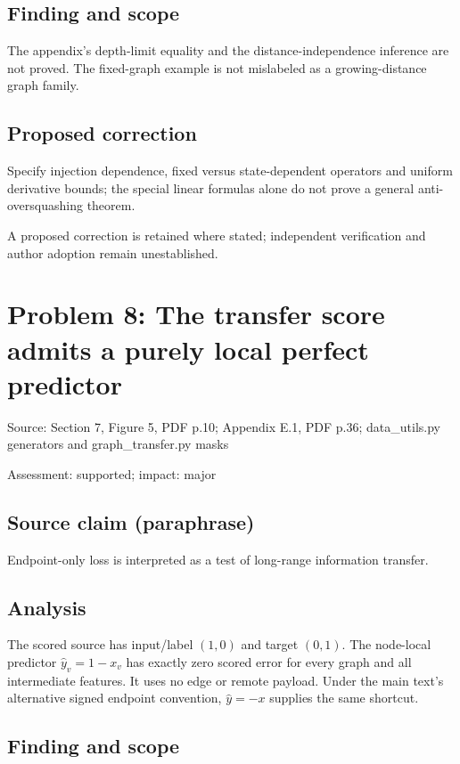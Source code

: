 \documentclass[11pt]{article}
\begin{document}
\subsection*{Finding and scope}

The appendix’s depth-limit equality and the distance-independence inference are not proved. The fixed-graph example is not mislabeled as a growing-distance graph family.

\subsection*{Proposed correction}

Specify injection dependence, fixed versus state-dependent operators and uniform derivative bounds; the special linear formulas alone do not prove a general anti-oversquashing theorem.

A proposed correction is retained where stated; independent verification and author adoption remain unestablished.

\section*{Problem 8: The transfer score admits a purely local perfect predictor}

Source: Section 7, Figure 5, PDF p.10; Appendix E.1, PDF p.36; data\_utils.py generators and graph\_transfer.py masks

Assessment: supported; impact: major

\subsection*{Source claim (paraphrase)}

Endpoint-only loss is interpreted as a test of long-range information transfer.

\subsection*{Analysis}

The scored source has input/label \((1,0)\) and target \((0,1)\). The node-local predictor \(\widehat y_v=1-x_v\) has exactly zero scored error for every graph and all intermediate features. It uses no edge or remote payload. Under the main text’s alternative signed endpoint convention, \(\widehat y=-x\) supplies the same shortcut.

\subsection*{Finding and scope}
\end{document}
